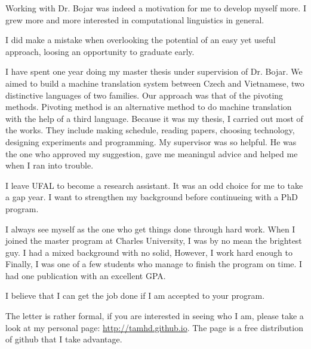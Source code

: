 \documentclass[a4paper, 12pt]{scrartcl}
\begin{document}
Working with Dr. Bojar was indeed a motivation for me to develop myself more. I grew more and more interested in computational linguistics in general. 



I did make a mistake when overlooking the potential of an easy yet useful approach, loosing an opportunity to graduate early. 


I have spent one year doing my master thesis under supervision of Dr. Bojar. 
We aimed to build a machine translation system between Czech and Vietnamese, two distinctive languages of two families. 
Our approach was that of the pivoting methods.
Pivoting method is an alternative method to do machine translation with the help of a third language. 
Because it was my thesis, I carried out most of the works. They include making schedule, reading papers, choosing technology, designing experiments and programming.
My supervisor was so helpful. 
He was the one who approved my suggestion, gave me meaningul advice and helped me when I ran into trouble. 




I leave UFAL to become a research assistant. 
It was an odd choice for me to take a gap year.
I want to strengthen my background before continueing with a PhD program. 






I always see myself as the one who get things done through hard work. 
When I joined the master program at Charles University, I was by no mean the brightest guy. 
I had a mixed background with no solid, 
However, I work hard enough to 
Finally, I was one of a few students who manage to finish the program on time. 
I had one publication with an excellent GPA. 

I believe that I can get the job done if I am accepted to your program.

The letter is rather formal, if you are interested in seeing who I am, please take a look at my personal page: \url{http://tamhd.github.io}. The page is a free distribution of github that I take advantage. 
\end{document}

